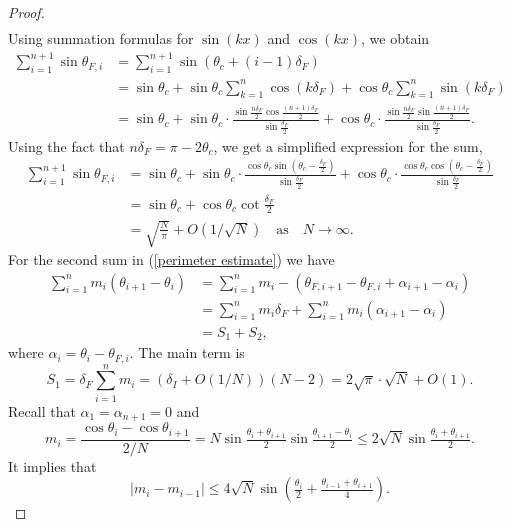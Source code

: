 \documentclass[a4paper,11pt]{amsart}
\begin{document}
\begin{proof}
\begin{align*}
\end{align*}
Using summation formulas for $\sin(kx)$ and $\cos(kx)$, we obtain 
\begin{align*}
    \sum\limits_{i=1}^{n+1}\sin\theta_{F,i}&=\sum\limits_{i=1}^{n+1}\sin(\theta_c+(i-1)\delta_F)\\ &=\sin\theta_c+\sin\theta_c\sum\limits_{k=1}^n \cos (k\delta_F)+\cos\theta_c\sum\limits_{k=1}^n\sin(k\delta_F)
    \\ &= \sin\theta_c+\sin\theta_c\cdot \frac{\sin\frac{n\delta_F}{2}\cos\frac{(n+1)\delta_F}{2}}{\sin\frac{\delta_F}{2}}+\cos\theta_c\cdot \frac{\sin\frac{n\delta_F}{2}\sin\frac{(n+1)\delta_F}{2}}{\sin\frac{\delta_F}{2}}.
\end{align*}
Using the fact that $n\delta_F=\pi-2\theta_c$, we get a simplified expression for the sum,
\begin{align*}
      \sum\limits_{i=1}^{n+1}\sin\theta_{F,i}&=\sin\theta_c+\sin\theta_c\cdot \frac{\cos\theta_c\sin(\theta_c-\frac{\delta_F}{2})}{\sin\frac{\delta_F}{2}}+\cos\theta_c\cdot \frac{\cos\theta_c\cos(\theta_c-\frac{\delta_F}{2})}{\sin\frac{\delta_F}{2}}
      \\ &=\sin\theta_c+\cos\theta_c\cot\frac{\delta_F}{2}
      \\ &=\sqrt{\frac{N}{\pi}}+O(1/\sqrt{N})\quad \text{as}\quad N\rightarrow\infty.
\end{align*}
For the second sum in (\ref{perimeter estimate}) we have
\begin{align*}
    \sum\limits_{i=1}^nm_i(\theta_{i+1}-\theta_i)&=\sum_{i=1}^nm_i-(\theta_{F,i+1}-\theta_{F,i}+\alpha_{i+1}-\alpha_i)
    \\&=\sum\limits_{i=1}^nm_i\delta_F+\sum\limits_{i=1}^nm_i(\alpha_{i+1}-\alpha_i)
    \\&=S_{1}+S_2,
\end{align*}
where $\alpha_i=\theta_i-\theta_{F,i}$. The main term is
$$S_1=\delta_F\sum\limits_{i=1}^nm_i=\left(\delta_I+O(1/N)\right)(N-2)=2\sqrt{\pi}\cdot\sqrt{N}+O(1).$$
Recall that $\alpha_1=\alpha_{n+1}=0$ and
\begin{equation*}
    m_{i}=\frac{\cos\theta_i-\cos\theta_{i+1}}{2/N}=N\sin\tfrac{\theta_i+\theta_{i+1}}{2}\sin\tfrac{\theta_{i+1}-\theta_{i}}{2}\leq2\sqrt N\sin \tfrac{\theta_i+\theta_{i+1}}{2}.
\end{equation*}
It implies that 
\begin{equation*}
    |m_{i}-m_{i-1}|\leq 4\sqrt{N}\sin\left(\tfrac{\theta_i}{2}+\tfrac{\theta_{i-1}+\theta_{i+1}}{4}\right).
\end{equation*}

\end{proof}
\end{document}
